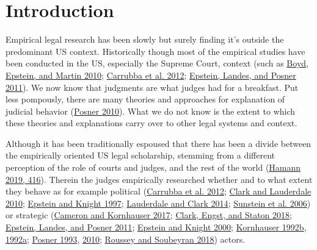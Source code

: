 \documentclass[
  11pt,
]{article}
\begin{document}
\doublespacing
\hypertarget{introduction}{%
\section{Introduction}\label{introduction}}

Empirical legal research has been slowly but surely finding it's outside
the predominant US context. Historically though most of the empirical
studies have been conducted in the US, especially the Supreme Court,
context (such as
\protect\hyperlink{ref-boydUntanglingCausalEffects2010}{Boyd, Epstein,
and Martin 2010};
\protect\hyperlink{ref-carrubbaWhoControlsContent2012}{Carrubba et al.
2012}; \protect\hyperlink{ref-epsteinWhyWhenJudges2011}{Epstein, Landes,
and Posner 2011}). We now know that judgments are what judges had for a
breakfast. Put less pompously, there are many theories and approaches
for explanation of judicial behavior
(\protect\hyperlink{ref-posnerHowJudgesThink2010}{Posner 2010}). What we
do not know is the extent to which these theories and explanations carry
over to other legal systems and context.

Although it has been traditionally espoused that there has been a divide
between the empirically oriented US legal scholarship, stemming from a
different perception of the role of courts and judges, and the rest of
the world (\protect\hyperlink{ref-hamannGermanFederalCourts2019}{Hamann
2019, 416}). Therein the judges empirically researched whether and to
what extent they behave as for example political
(\protect\hyperlink{ref-carrubbaWhoControlsContent2012}{Carrubba et al.
2012}; \protect\hyperlink{ref-clarkLocatingSupremeCourt2010}{Clark and
Lauderdale 2010};
\protect\hyperlink{ref-epsteinChoicesJusticesMake1997}{Epstein and
Knight 1997};
\protect\hyperlink{ref-lauderdaleScalingPoliticallyMeaningful2014}{Lauderdale
and Clark 2014};
\protect\hyperlink{ref-sunsteinAreJudgesPolitical2006}{Sunstein et al.
2006}) or strategic
(\protect\hyperlink{ref-cameronChapterWhatJudges2017}{Cameron and
Kornhauser 2017};
\protect\hyperlink{ref-clarkEstimatingEffectLeisure2018}{Clark, Engst,
and Staton 2018};
\protect\hyperlink{ref-epsteinWhyWhenJudges2011}{Epstein, Landes, and
Posner 2011};
\protect\hyperlink{ref-epsteinStrategicRevolutionJudicial2000}{Epstein
and Knight 2000};
\protect\hyperlink{ref-kornhauserModelingCollegialCourts1992}{Kornhauser
1992b},
\protect\hyperlink{ref-kornhauserModelingCollegialCourts1992a}{1992a};
\protect\hyperlink{ref-posnerWhatJudgesJustices1993}{Posner 1993},
\protect\hyperlink{ref-posnerHowJudgesThink2010}{2010};
\protect\hyperlink{ref-rousseyOverburdenedJudges2018}{Roussey and
Soubeyran 2018}) actors.
\end{document}
